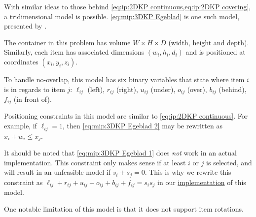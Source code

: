 With similar ideas to those behind \cref{eq:ip:2DKP continuous,eq:ip:2DKP covering}, a tridimensional model is possible. \cref{eq:mip:3DKP Egeblad} is one such model, presented by \textcite{EGEBLAD2009}.

The container in this problem has volume $W \times H \times D$ (width, height and depth). Similarly, each item has associated dimensions $(w_i,h_i,d_i)$ and is positioned at coordinates $(x_i,y_i,z_i)$.

To handle no-overlap, this model has six binary variables that state where item $i$ is in regards to item $j$: $\ell_{ij}$ (left), $r_{ij}$ (right), $u_{ij}$ (under), $o_{ij}$ (over), $b_{ij}$ (behind), $f_{ij}$ (in front of).

Positioning constraints in this model are similar to \cref{eq:ip:2DKP continuous}. For example, if $\ell_{ij} = 1$, then \cref{eq:mip:3DKP Egeblad 2} may be rewritten as $x_i + w_i \leq x_j$.

It should be noted that \cref{eq:mip:3DKP Egeblad 1} does \emph{not} work in an actual implementation. This constraint only makes sense if at least $i$ or $j$ is selected, and will result in an unfeasible model if $s_i + s_j = 0$. This is why we rewrite this constraint as $\ell_{ij} + r_{ij} + u_{ij} + o_{ij} + b_{ij} + f_{ij} = s_i s_j$ in our \href{https://github.com/phcentenaro7/IC-Knapsack/blob/5a6cb381dc20d3dbfcf1a31c8181aadd1a6c9988/Knapsack/Egeblad/knapsack_model.jl#L47}{implementation} of this model.

One notable limitation of this model is that it does not support item rotations.

